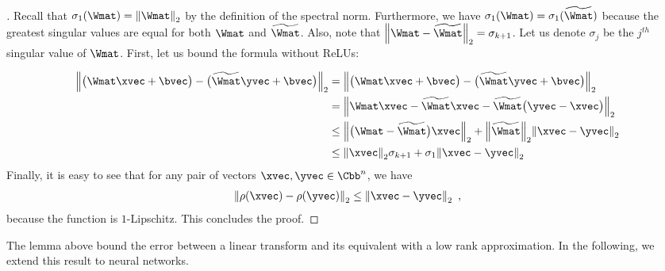 \begin{proof}[]
  Recall that $\sigma_1(\Wmat) = \norm{\Wmat}_2$ by the definition of the spectral norm.
  Furthermore, we have $\sigma_1(\Wmat) = \sigma_1(\widetilde{\Wmat})$ because the greatest singular values are equal for both $\Wmat$ and $\widetilde{\Wmat}$.
  Also, note that $\norm{\Wmat - \widetilde{\Wmat}}_{2} = \sigma_{k+1}$.
  Let us denote $\sigma_j$ be the $j^{th}$ singular value of $\Wmat$.
  First, let us bound the formula without ReLUs:

  \begin{align}
    \norm{\big(\Wmat\xvec+\bvec\big) - \big(\widetilde{\Wmat} \yvec + \bvec \big)}_2 &= \norm{\big(\Wmat \xvec+ \bvec \big) - \big(\widetilde{\Wmat} \yvec + \bvec \big)}_2 \\
     &= \norm{\Wmat\xvec - \widetilde{\Wmat} \xvec - \widetilde{\Wmat} \big(\yvec - \xvec \big)}_2 \\
     &\le \norm{\big(\Wmat - \widetilde{\Wmat}\big)\xvec}_2 + \norm{\widetilde{\Wmat}}_{2} \norm{\xvec - \yvec}_2 \\
     &\le \norm{\xvec}_2 \sigma_{k+1} + \sigma_1 \norm{\xvec - \yvec}_2 
  \end{align}
  Finally, it is easy to see that for any pair of vectors $\xvec,\yvec \in \Cn$, we have
  \begin{equation}
    \norm{ \act(\xvec) - \act(\yvec)}_2 \le \norm{\xvec - \yvec}_2 \enspace,
  \end{equation}
  because the \relu function is $1$-Lipschitz.
  This concludes the proof.
\end{proof}

The lemma above bound the error between a linear transform and its equivalent with a low rank approximation.
In the following, we extend this result to neural networks.


